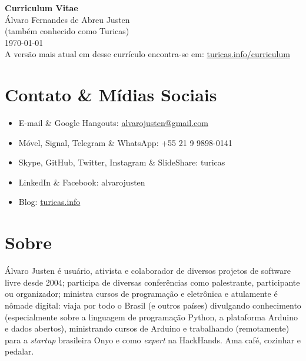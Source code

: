 \documentclass[a4paper,11pt]{article}
\begin{document}
\pagestyle{empty}

\begin{center}
 \huge{\textbf{Curriculum Vitae}}
 \\
 \huge{Álvaro Fernandes de Abreu Justen}
 \\
 \small{(também conhecido como Turicas)}
 \large{\\}
 \large{\today}
 \\
 \small{A versão mais atual em desse currículo encontra-se em:
        \href{http://turicas.info/curriculum}{turicas.info/curriculum}}
\end{center}

\newcommand{\titulo}[1]{\section*{#1}}
\renewcommand{\labelitemi}{$\diamond$}
\renewcommand{\labelitemii}{$\rightarrow$}

\titulo{Contato \& Mídias Sociais}
	\begin{itemize}
		\renewcommand{\labelitemi}{}
		\item E-mail \& Google Hangouts: \url{alvarojusten@gmail.com}
		\item Móvel, Signal, Telegram \& WhatsApp: +55 21 9 9898-0141
		\item Skype, GitHub, Twitter, Instagram \& SlideShare: turicas
		\item LinkedIn \& Facebook: alvarojusten
		\item Blog: \href{http://turicas.info/}{turicas.info}
	\end{itemize}

\titulo{Sobre}

Álvaro Justen é usuário, ativista e colaborador de diversos projetos de
software livre desde 2004; participa de diversas conferências como palestrante,
participante ou organizador; ministra cursos de programação e eletrônica e
atulamente é nômade digital: viaja por todo o Brasil (e outros países)
divulgando conhecimento (especialmente sobre a linguagem de programação Python,
a plataforma Arduino e dados abertos), ministrando cursos de Arduino e
trabalhando (remotamente) para a \textit{startup} brasileira Onyo e como
\textit{expert} na HackHands. Ama café, cozinhar e pedalar.
\end{document}
